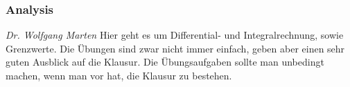 
\subsubsection{Analysis}
	\textit{Dr. Wolfgang Marten}
	Hier geht es um Differential- und Integralrechnung, sowie Grenzwerte. Die Übungen sind zwar nicht immer einfach, geben aber einen sehr guten Ausblick auf die Klausur. Die Übungsaufgaben sollte man unbedingt machen, wenn man vor hat, die Klausur zu bestehen.
